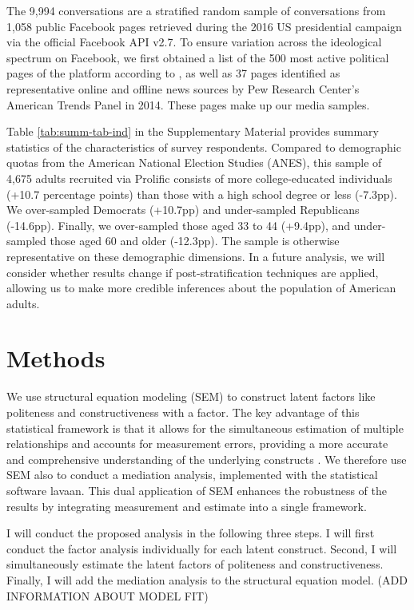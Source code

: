 \documentclass{article}
\begin{document}
The 9,994 conversations are a stratified random sample of conversations from 1,058 public Facebook pages retrieved during the 2016 US presidential campaign via the official Facebook API v2.7. To ensure variation across the ideological spectrum on Facebook, we first obtained a list of the 500 most active political pages of the platform according to \citet{bakshy_exposure_2015}, as well as 37 pages identified as representative online and offline news sources by Pew Research Center’s American Trends Panel in 2014. These pages make up our media samples.

Table \ref{tab:summ-tab-ind} in the Supplementary Material provides summary statistics of the characteristics of survey respondents. Compared to demographic quotas from the American National Election Studies (ANES), this sample of 4,675 adults recruited via Prolific consists of more college-educated individuals (+10.7 percentage points) than those with a high school degree or less (-7.3pp). We over-sampled Democrats (+10.7pp) and under-sampled Republicans (-14.6pp). Finally, we over-sampled those aged 33 to 44 (+9.4pp), and under-sampled those aged 60 and older (-12.3pp). The sample is otherwise representative on these demographic dimensions. In a future analysis, we will consider whether results change if post-stratification techniques are applied, allowing us to make more credible inferences about the population of American adults.

\section{Methods}

We use structural equation modeling (SEM) to construct latent factors like politeness and constructiveness with a factor. The key advantage of this statistical framework is that it allows for the simultaneous estimation of multiple relationships and accounts for measurement errors, providing a more accurate and comprehensive understanding of the underlying constructs \citep{kline_principles_2016}. We therefore use SEM also to conduct a mediation analysis, implemented with the statistical software lavaan. This dual application of SEM enhances the robustness of the results by integrating measurement and estimate into a single framework.

I will conduct the proposed analysis in the following three steps. I will first conduct the factor analysis individually for each latent construct. Second, I will simultaneously estimate the latent factors of politeness and constructiveness. Finally, I will add the mediation analysis to the structural equation model. (ADD INFORMATION ABOUT MODEL FIT)
\end{document}
